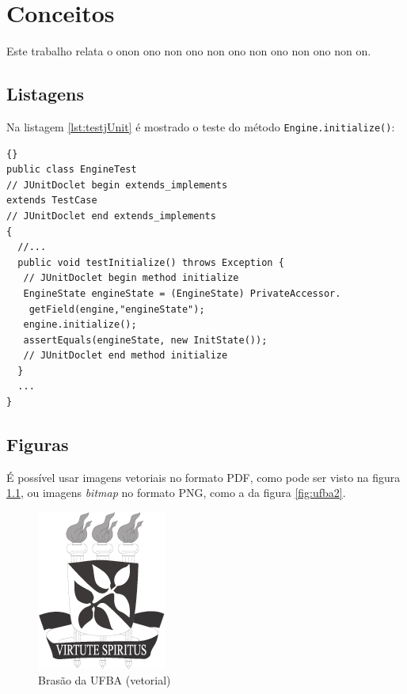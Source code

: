 \chapter{Conceitos} \label{cap:conceitos}

Este trabalho relata o onon ono non ono non ono non ono non ono non on.

\section{Listagens} \label{sec:listagens}

Na listagem \ref{lst:testjUnit} 
é mostrado o teste do método \texttt{Engine.initialize()}:

\lstset{language=java}
\lstset{commentstyle=\textit}
\begin{lstlisting}[frame=trbl, caption=Classe Factory2D,label=lst:testjUnit]{}
public class EngineTest
// JUnitDoclet begin extends_implements
extends TestCase
// JUnitDoclet end extends_implements
{
  //...
  public void testInitialize() throws Exception {
   // JUnitDoclet begin method initialize
   EngineState engineState = (EngineState) PrivateAccessor.
    getField(engine,"engineState");
   engine.initialize();
   assertEquals(engineState, new InitState());
   // JUnitDoclet end method initialize
  }
  ...
}
\end{lstlisting}

\section{Figuras} \label{sec:figuras}

É possível usar imagens vetoriais no formato PDF, como pode ser visto
na figura \ref{fig:ufba}, ou imagens \emph{bitmap} no formato PNG, como
a da figura \ref{fig:ufba2}.

\begin{figure}
\centering
\includegraphics{brasaoUFBA2}
\caption{Brasão da UFBA (vetorial)}
\label{fig:ufba}
\end{figure}

